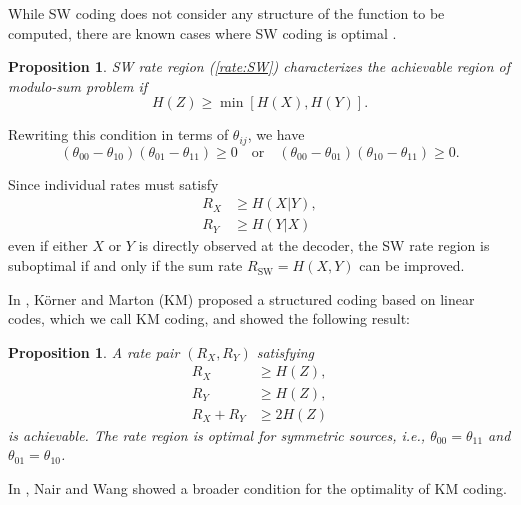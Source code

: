 \documentclass[journal,onecolumn]{IEEEtran}
\newtheorem{proposition}[theorem]{Proposition}
\theoremstyle{definition}
\theoremstyle{remark}
\begin{document}
While SW coding does not consider any structure of the function to be computed, there are known cases where SW coding is optimal \cite[Ex 16.23]{Csiszár_Körner_2011}.
\begin{proposition}
    SW rate region (\ref{rate:SW}) characterizes the achievable region of modulo-sum problem if
    \begin{equation}
        H(Z) \geq\min [H(X),H(Y)].
    \end{equation}
\end{proposition} 
    
Rewriting this condition in terms of $\theta_{ij}$, we have
\begin{equation}\label{cond:SW optimal parameter}
    (\theta_{00}-\theta_{10})(\theta_{01}-\theta_{11}) \geq 0 \quad \text{or} \quad (\theta_{00}-\theta_{01})(\theta_{10}-\theta_{11}) \geq 0.
\end{equation}

Since individual rates must satisfy 
\begin{align*}
    R_X &\geq H(X|Y),\\
    R_Y &\geq H(Y|X)
\end{align*}
even if either $X$ or $Y$ is directly observed at the decoder, 
the SW rate region is suboptimal if and only if the sum rate $R_{\mathrm{SW}}=H(X,Y)$ can be improved.


In \cite{KM}, Körner and Marton (KM) proposed a structured coding based on linear codes, which we call KM coding, and showed the following result:
\begin{proposition}
    A rate pair $(R_X,R_Y)$ satisfying 
    \begin{equation}        
        \begin{aligned}\label{rate:KM}
            R_X &\geq H(Z),\\
            R_Y &\geq H(Z),\\
            R_X + R_Y &\geq 2H(Z)
        \end{aligned}
    \end{equation}
    is achievable.
    The rate region is optimal for symmetric sources, i.e., $\theta_{00}=\theta_{11}$ and $\theta_{01}=\theta_{10}$.
\end{proposition}
In \cite{Nair}, Nair and Wang showed a broader condition for the optimality of KM coding.
    
\end{document}
